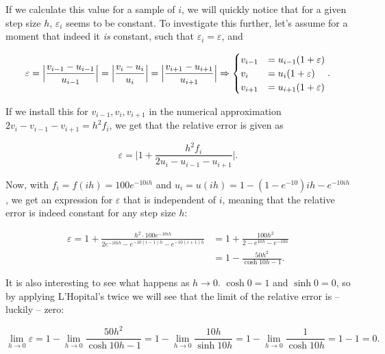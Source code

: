 \documentclass[]{article}
\begin{document}
If we calculate this value for a sample of $i$, we will quickly notice that for a given step size $h$, $\varepsilon_i$ seems to be constant. To investigate this further, let's assume for a moment that indeed it \textit{is} constant, such that $\varepsilon_i = \varepsilon$, and

\begin{equation*}
\varepsilon = \Bigl \lvert \frac{v_{i-1} - u_{i-1}}{u_{i-1}} \Bigr \rvert = \Bigl \lvert \frac{v_{i} - u_{i}}{u_{i}} \Bigr \rvert = \Bigl \lvert \frac{v_{i+1} - u_{i+1}}{u_{i+1}} \Bigr \rvert \Rightarrow \begin{cases}
v_{i-1} &= u_{i-1}(1+\varepsilon) \\
v_{i} &= u_{i}(1+\varepsilon) \\
v_{i+1} &= u_{i+1}(1+\varepsilon)
\end{cases} \text{.}
\end{equation*}

If we install this for $v_{i-1},v_{i},v_{i+1}$ in the numerical approximation $2v_i - v_{i-1} - v_{i+1} = h^{2}f_i$, we get that the relative error is given as

\begin{equation*}
\varepsilon = \Biggl \lvert 1+ \frac{h^{2}f_i}{2u_i - u_{i-1} - u_{i+1}} \Biggr \rvert \text{.}
\end{equation*}

Now, with $f_i = f(ih) = 100e^{-10ih}$ and $u_i = u(ih) = 1 - (1 - e^{-10})ih - e^{-10ih}$, we get an expression for $\varepsilon$ that is independent of $i$, meaning that the relative error is indeed constant for any step size $h$:

\begin{equation}
\begin{split}
\label{eqn:eps-math}
\varepsilon = 1+ \frac{h^{2} \cdot 100e^{-10ih}}{2e^{-10ih} - e^{-10(i-1)h} - e^{-10(i+1)h}} &= 1+ \frac{100h^{2}}{2 - e^{10h} - e^{-10h}} \\&= 1 - \frac{50h^2}{\cosh 10h - 1} \text{.}
\end{split}
\end{equation}

It is also interesting to see what happens as $h \rightarrow 0$. $\cosh 0 = 1$ and $\sinh 0 = 0$, so by applying L'Hopital's twice we will see that the limit of the relative error is -- luckily -- zero:

\begin{equation*}
\lim_{h \to 0} \varepsilon = 1 - \lim_{h \to 0}\frac{50h^2}{\cosh 10h - 1}  = 1 - \lim_{h \to 0}\frac{10h}{\sinh 10h} = 1 - \lim_{h \to 0}\frac{1}{\cosh 10h} = 1-1 = 0 \text{.}
\end{equation*}
\end{document}

